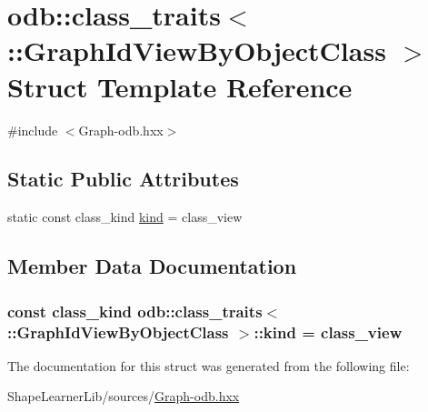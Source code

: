 \hypertarget{structodb_1_1class__traits_3_01_1_1_graph_id_view_by_object_class_01_4}{}\section{odb\+:\+:class\+\_\+traits$<$ \+:\+:Graph\+Id\+View\+By\+Object\+Class $>$ Struct Template Reference}
\label{structodb_1_1class__traits_3_01_1_1_graph_id_view_by_object_class_01_4}


{\ttfamily \#include $<$Graph-\/odb.\+hxx$>$}

\subsection*{Static Public Attributes}
\begin{DoxyCompactItemize}
\item 
static const class\+\_\+kind \hyperlink{structodb_1_1class__traits_3_01_1_1_graph_id_view_by_object_class_01_4_a2501eef5295907de14ceba8680327169}{kind} = class\+\_\+view
\end{DoxyCompactItemize}


\subsection{Member Data Documentation}
\hypertarget{structodb_1_1class__traits_3_01_1_1_graph_id_view_by_object_class_01_4_a2501eef5295907de14ceba8680327169}{}
\subsubsection[{kind}]{\setlength{\rightskip}{0pt plus 5cm}const class\+\_\+kind odb\+::class\+\_\+traits$<$ \+::{\bf Graph\+Id\+View\+By\+Object\+Class} $>$\+::kind = class\+\_\+view\hspace{0.3cm}{\ttfamily [static]}}\label{structodb_1_1class__traits_3_01_1_1_graph_id_view_by_object_class_01_4_a2501eef5295907de14ceba8680327169}


The documentation for this struct was generated from the following file\+:\begin{DoxyCompactItemize}
\item 
Shape\+Learner\+Lib/sources/\hyperlink{_graph-odb_8hxx}{Graph-\/odb.\+hxx}\end{DoxyCompactItemize}
